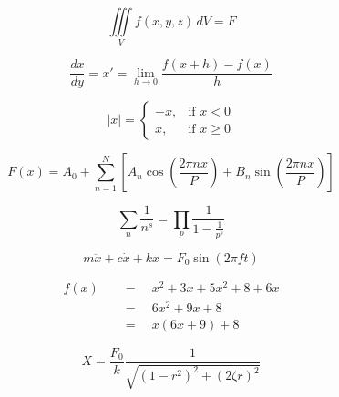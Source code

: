 \documentclass{article}
\begin{document}
\begin{equation*}\iiint\limits_V f(x,y,z)\,dV
 =
F\end{equation*}
\notag



\begin{equation*}\frac{dx}{dy}
=
x'
=
\lim_{h \to 0}\frac{f(x+h)-f(x)}{h}\end{equation*}
\notag



\begin{equation*}|x|
=
\begin{cases}-x, & \text{if $x < 0$}\\x, & \text{if $x \geq 0$}\end{cases}\end{equation*}
\notag



\begin{equation*}F(x)=
 A_0 + \sum_{n=1}^N\left[ A_n\cos{\left(\frac{2\pi nx}{P}\right)}+B_n\sin{\left(\frac{2\pi nx}{P}\right)}\right]\end{equation*}
\notag



\begin{equation*}\sum_n \frac{1}{n^s}
=\prod_p \frac{1}{1-\frac{1}{p^s}}\end{equation*}
\notag




\begin{equation*}         %
m\ddot{x}+c\dot{x}+kx
=
F_0\sin(2\pi ft)\end{equation*}\notag



\begin{align*}f(x)\quad &=\quad x^2 + 3x + 5x^2 +8 +6x\\&=\quad 6x^2 +9x +8\\&=\quad x(6x+9)+8
\end{align*}


$$X
=
\frac{F_0}{k}\frac{1}{\sqrt{(1-r^2)^2+(2\zeta r)^2}}$$\\\notag
\end{document}
